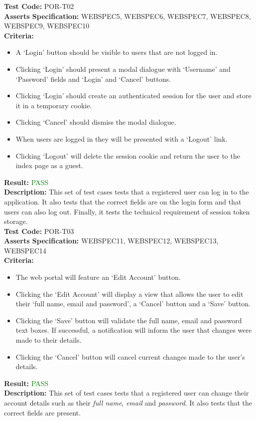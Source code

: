 \documentclass[11pt,a4paper]{report}
\begin{document}
\label{test:POR-T02}
\noindent\textbf{Test Code:} POR-T02\\
\textbf{Asserts Specification:} WEBSPEC5, WEBSPEC6, WEBSPEC7, WEBSPEC8, WEBSPEC9, WEBSPEC10 \\ 
\textbf{Criteria:} \begin{itemize}
                     \item A `Login' button should be visible to users that are not logged in.
                     \item Clicking `Login' should present a modal dialogue with `Username' and `Password' fields and `Login' and `Cancel' buttons.
                     \item Clicking `Login' should create an authenticated session for the user and store it in a temporary cookie.
                     \item Clicking `Cancel' should dismiss the modal dialogue.
                     \item When users are logged in they will be presented with a `Logout' link.
                     \item Clicking `Logout' will delete the session cookie and return the user to the index page as a guest.
                   \end{itemize}  
\textbf{Result:} \textcolor{green}{PASS}\\ 
\textbf{Description:} This set of test cases tests that a registered user can log in to the application. It also tests that the correct fields are on the login form and that users can also log out. Finally, it tests the technical requirement of session token storage. \\

\label{test:POR-T03}
\noindent\textbf{Test Code:} POR-T03\\
\textbf{Asserts Specification:} WEBSPEC11, WEBSPEC12, WEBSPEC13, WEBSPEC14 \\ 
\textbf{Criteria:} \begin{itemize}
                     \item The web portal will feature an `Edit Account' button.
                     \item Clicking the `Edit Account' will display a view that allows the user to edit their `full name, email and password', a `Cancel' button and a `Save' button.
                     \item Clicking the `Save' button will validate the full name, email and password text boxes. If successful, a notification will inform the user that changes were made to their details.
                     \item Clicking the `Cancel' button will cancel current changes made to the user's details.
                   \end{itemize}  
\textbf{Result:} \textcolor{green}{PASS}\\ 
\textbf{Description:} This set of test cases tests that a registered user can change their account details such as their \emph{full name}, \emph{email} and \emph{password}. It also tests that the correct fields are present. \\
\end{document}
